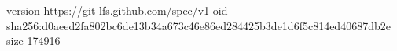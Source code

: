 version https://git-lfs.github.com/spec/v1
oid sha256:d0aeed2fa802bc6de13b34a673c46e86ed284425b3de1d6f5c814ed40687db2e
size 174916
